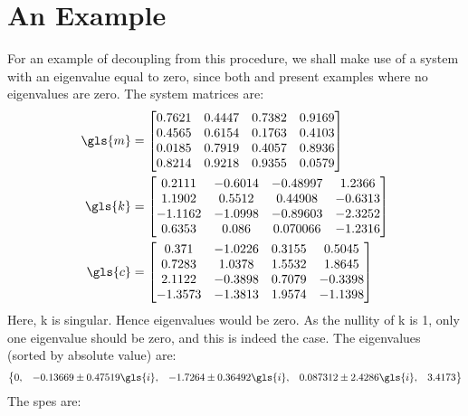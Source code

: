 \section{An Example}
\label{sec:ex_sing}
For an example of decoupling from this procedure, we shall make use of
a system with an eigenvalue equal to zero, since both \citet{Chu200896}
and \citet{GARVEY2002885} present examples where no eigenvalues are zero.
The system matrices are:
\begin{align}
\gls{m} &= \begin{bmatrix}
 0.7621  &     0.4447   &    0.7382    &   0.9169\\
   0.4565  &     0.6154    &   0.1763    &   0.4103\\
   0.0185   &    0.7919   &    0.4057    &   0.8936\\
   0.8214   &    0.9218   &    0.9355     &  0.0579
\end{bmatrix}\\
\gls{k} &= \begin{bmatrix}
0.2111   &   -0.6014   &  -0.48997   &    1.2366\\
   1.1902  &     0.5512  &    0.44908   &   -0.6313\\
  -1.1162   &   -1.0998  &   -0.89603   &   -2.3252\\
   0.6353   &     0.086  &   0.070066   &   -1.2316
\end{bmatrix}\\
\gls{c} &= \begin{bmatrix}
 0.371  &    -1.0226  &     0.3155   &    0.5045\\
   0.7283   &    1.0378   &    1.5532  &     1.8645\\
   2.1122   &   -0.3898   &    0.7079   &   -0.3398\\
  -1.3573  &    -1.3813   &    1.9574   &   -1.1398
\end{bmatrix}
\end{align}
Here, \gls{k} is singular. Hence eigenvalues would be zero. As the nullity 
of \gls{k} is 1, only one eigenvalue should be zero, and this is indeed 
the case. The eigenvalues (sorted by absolute value) are:
\begin{align}
\left\lbrace\begin{matrix}
 0, & -0.13669 \pm 0.47519\gls{i}, & -1.7264 \pm 0.36492\gls{i}, & 0.087312 \pm 2.4286\gls{i}, & 3.4173
\end{matrix}\right\rbrace
\end{align}
The \glspl{spe} are:
